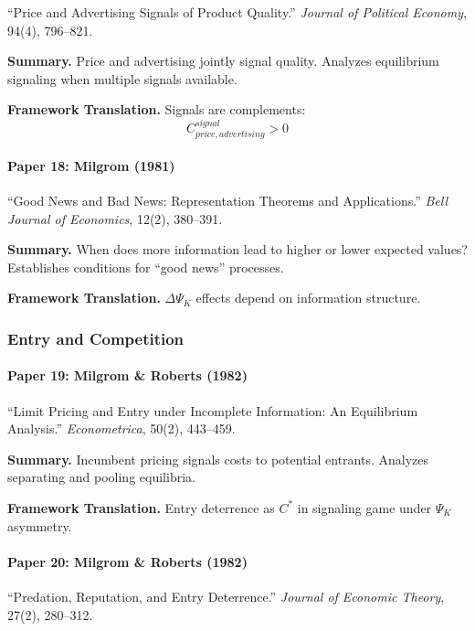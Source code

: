 ``Price and Advertising Signals of Product Quality.''
\textit{Journal of Political Economy}, 94(4), 796--821.

\textbf{Summary.}
Price and advertising jointly signal quality. Analyzes equilibrium 
signaling when multiple signals available.

\textbf{Framework Translation.}
Signals are complements:
\begin{equation}
C_{price, advertising}^{signal} > 0
\end{equation}

\paragraph{Paper 18: Milgrom (1981)}

``Good News and Bad News: Representation Theorems and Applications.''
\textit{Bell Journal of Economics}, 12(2), 380--391.

\textbf{Summary.}
When does more information lead to higher or lower expected values? 
Establishes conditions for ``good news'' processes.

\textbf{Framework Translation.}
$\Delta \Psi_K$ effects depend on information structure.

\subsubsection{Entry and Competition}

\paragraph{Paper 19: Milgrom \& Roberts (1982)}

``Limit Pricing and Entry under Incomplete Information: An Equilibrium Analysis.''
\textit{Econometrica}, 50(2), 443--459.

\textbf{Summary.}
Incumbent pricing signals costs to potential entrants. Analyzes 
separating and pooling equilibria.

\textbf{Framework Translation.}
Entry deterrence as $C^*$ in signaling game under $\Psi_K$ asymmetry.

\paragraph{Paper 20: Milgrom \& Roberts (1982)}

``Predation, Reputation, and Entry Deterrence.''
\textit{Journal of Economic Theory}, 27(2), 280--312.

